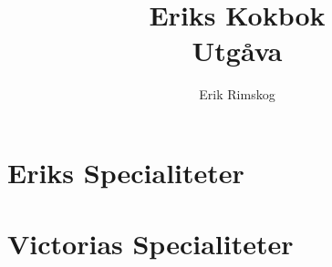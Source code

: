\documentclass[12pt,a4paper]{article}
\title{\Huge Eriks Kokbok\\\medskip
  \large Utgåva \version\qualifier\\\smallskip
  \small\texttt\shortHEAD}
\author{Erik Rimskog}
\newcommand{\includerecipe}[1]{}
\begin{document}
\maketitle
\thispagestyle{empty}
\newpage
\tableofcontents
\newpage
\part{Eriks Specialiteter}
\includerecipe{korvstroganoff}
\includerecipe{pannkakor}
\includerecipe{carbonara}
\includerecipe{teriyaki}
\includerecipe{köttfärssås}
\includerecipe{dojan}

\part{Victorias Specialiteter}
\includerecipe{linscurry}
\includerecipe{vegetarisk-lasagne}
\includerecipe{tandoorigryta}
\end{document}
